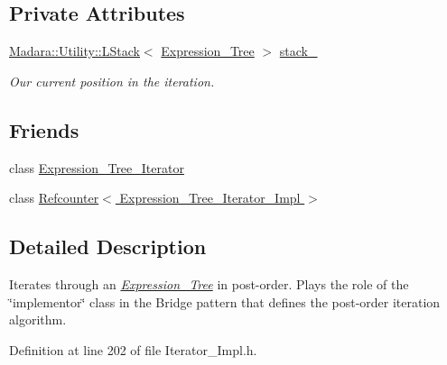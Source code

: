 \subsection*{Private Attributes}
\begin{DoxyCompactItemize}
\item 
\hyperlink{classMadara_1_1Utility_1_1LStack}{Madara::Utility::LStack}$<$ \hyperlink{classMadara_1_1Expression__Tree_1_1Expression__Tree}{Expression\_\-Tree} $>$ \hyperlink{classMadara_1_1Expression__Tree_1_1Post__Order__Iterator__Impl_a6919a91bb3a0e156991ff459a0366b34}{stack\_\-}
\begin{DoxyCompactList}\small\item\em Our current position in the iteration. \item\end{DoxyCompactList}\end{DoxyCompactItemize}
\subsection*{Friends}
\begin{DoxyCompactItemize}
\item 
class \hyperlink{classMadara_1_1Expression__Tree_1_1Post__Order__Iterator__Impl_adfe8d209b4dd64ac100d4c9c9adf08c1}{Expression\_\-Tree\_\-Iterator}
\item 
class \hyperlink{classMadara_1_1Expression__Tree_1_1Post__Order__Iterator__Impl_aebe1f916414d809cae08793459b42a35}{Refcounter$<$ Expression\_\-Tree\_\-Iterator\_\-Impl $>$}
\end{DoxyCompactItemize}


\subsection{Detailed Description}
Iterates through an {\itshape \hyperlink{classMadara_1_1Expression__Tree_1_1Expression__Tree}{Expression\_\-Tree}\/} in post-\/order. Plays the role of the \char`\"{}implementor\char`\"{} class in the Bridge pattern that defines the post-\/order iteration algorithm. 

Definition at line 202 of file Iterator\_\-Impl.h.



